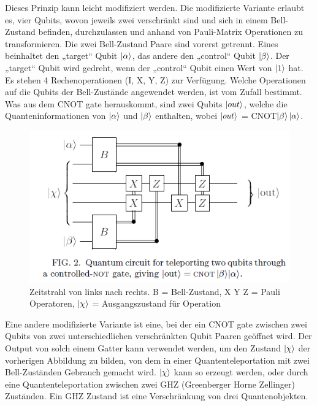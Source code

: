 \noindent Dieses Prinzip kann leicht modifiziert werden. Die modifizierte Variante erlaubt es, vier Qubits, wovon jeweils zwei verschränkt sind und sich in einem Bell-Zustand befinden, durchzulassen und anhand von Pauli-Matrix Operationen zu transformieren. Die zwei Bell-Zustand Paare sind vorerst getrennt. Eines beinhaltet den „target“ Qubit \(\ket{\alpha}\), das andere den „control“ Qubit \(\ket{\beta}\). Der „target“ Qubit wird gedreht, wenn der „control“ Qubit einen Wert von \(\ket{1}\) hat. Es stehen 4 Rechenoperationen (I, X, Y, Z) zur Verfügung. Welche Operationen auf die Qubits der Bell-Zustände angewendet werden, ist vom Zufall bestimmt. Was aus dem CNOT gate herauskommt, sind zwei Qubits \(\ket{out}\), welche die Quanteninformationen von \(\ket{\alpha}\) und \(\ket{\beta}\) enthalten, wobei \(\ket{out}\) = CNOT\(\ket{\beta}\)\(\ket{\alpha}\).\\
\begin{figure}[h!]
    \centering
    \includegraphics[width=1.0\textwidth]{images/quantum-information/quantenteleportation_cnot_2.png}
    \caption{Zeitstrahl von links nach rechts. B = Bell-Zustand, X Y Z = Pauli Operatoren, \(\ket{\chi}\) = Ausgangszustand für Operation}
    \label{fig:meinbild}
\end{figure}
\newpage
\noindent Eine andere modifizierte Variante ist eine, bei der ein CNOT gate zwischen zwei Qubits von zwei unterschiedlichen verschränkten Qubit Paaren geöffnet wird. Der Output von solch einem Gatter kann verwendet werden, um den Zustand \(\ket{\chi}\) der vorherigen Abbildung zu bilden, von dem in einer Quantenteleportation mit zwei Bell-Zuständen Gebrauch gemacht wird. \(\ket{\chi}\) kann so erzeugt werden, oder durch eine Quantenteleportation zwischen zwei GHZ (Greenberger Horne Zellinger) Zuständen. Ein GHZ Zustand ist eine Verschränkung von drei Quantenobjekten.\\
